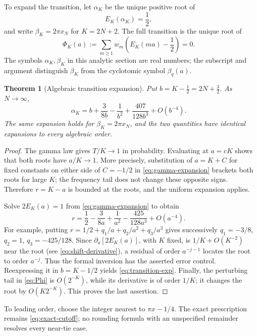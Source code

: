 \documentclass[11pt]{article}
\numberwithin{equation}{section}
\newtheorem{theorem}{Theorem}[section]
\theoremstyle{definition}
\theoremstyle{remark}
\begin{document}
To expand the transition, let $\alpha_K$ be the unique positive root of
\begin{equation}\label{eq:alpha}
 E_K(\alpha_K)=\frac12,
\end{equation}
and write $\beta_K=2\pi x_N$ for $K=2N+2$. The full transition is
the unique root of
\begin{equation}\label{eq:Phi}
 \Phi_K(a):=\sum_{m\ge1}w_m\left(E_K(ma)-\frac12\right)=0.
\end{equation}
The symbols $\alpha_K,\beta_K$ in this analytic section are real
numbers; the subscript and argument distinguish $\beta_K$ from the
cyclotomic symbol $\beta_q(a)$.

\begin{theorem}[Algebraic transition expansion]\label{thm:transition-exp}
Put $b=K-\tfrac12=2N+\tfrac32$. As $N\to\infty$,
\begin{equation}\label{eq:transition-exp}
 \alpha_K=b+\frac3{8b}-\frac1{b^2}
                +\frac{407}{128b^3}+O(b^{-4}).
\end{equation}
The same expansion holds for $\beta_K=2\pi x_N$, and the two
quantities have identical expansions to every algebraic order.
\end{theorem}
\begin{proof}
The gamma law gives $T/K\to1$ in probability. Evaluating at $a=cK$
shows that both roots have $a/K\to1$. More precisely, substitution
of $a=K+C$ for fixed constants on either side of $C=-1/2$
in \eqref{eq:gamma-expansion} brackets both roots for large $K$;
the frequency tail does not change these opposite signs. Therefore
$r=K-a$ is bounded at the roots, and the uniform expansion applies.

Solve $2E_K(a)=1$ from \eqref{eq:gamma-expansion} to obtain
\[
 r=\frac12-\frac3{8a}+\frac1{a^2}
                    -\frac{425}{128a^3}+O(a^{-4}).
\]
For example, putting $r=1/2+q_1/a+q_2/a^2+q_3/a^3$ gives
successively $q_1=-3/8$, $q_2=1$, $q_3=-425/128$.
Since $\partial_a[2E_K(a)]$, with $K$ fixed, is
$1/K+O(K^{-2})$ near the root (see \eqref{eq:shift-derivative}),
a residual of order
$a^{-j-1}$ locates the root to order $a^{-j}$. Thus the formal
inversion has the asserted error control. Reexpressing it in
$b=K-1/2$ yields \eqref{eq:transition-exp}. Finally, the perturbing
tail in \eqref{eq:Phi} is $O(2^{-K})$, while its derivative is of
order $1/K$; it changes the root by $O(K2^{-K})$. This proves the
last assertion.
\end{proof}

To leading order, choose the integer nearest to $\pi x-1/4$.
The exact prescription remains \eqref{eq:exact-cutoff}; no rounding
formula with an unspecified remainder resolves every near-tie case.
\end{document}

